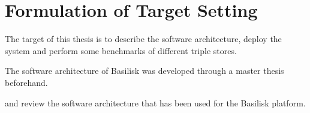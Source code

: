 \chapter{Formulation of Target Setting}
\label{ch:target_setting}

The target of this thesis is to describe the software architecture, deploy the system and perform some benchmarks of different triple stores.



The software architecture of Basilisk was developed through a master thesis beforehand. 

 and review the software architecture that has been used for the Basilisk platform.
